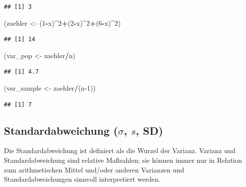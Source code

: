 \documentclass[
]{book}
\newenvironment{Shaded}{\begin{snugshade}}{\end{snugshade}}
\newcommand{\DecValTok}[1]{\textcolor[rgb]{0.00,0.00,0.81}{#1}}
\newcommand{\NormalTok}[1]{#1}
\newcommand{\OperatorTok}[1]{\textcolor[rgb]{0.81,0.36,0.00}{\textbf{#1}}}
\newcommand{\StringTok}[1]{\textcolor[rgb]{0.31,0.60,0.02}{#1}}
\begin{document}
\begin{verbatim}
## [1] 3
\end{verbatim}

\begin{Shaded}
\begin{Highlighting}[]
\NormalTok{(zaehler <-}\StringTok{ }\NormalTok{(}\DecValTok{1}\OperatorTok{-}\NormalTok{x)}\OperatorTok{^}\DecValTok{2}\OperatorTok{+}\NormalTok{(}\DecValTok{2}\OperatorTok{-}\NormalTok{x)}\OperatorTok{^}\DecValTok{2}\OperatorTok{+}\NormalTok{(}\DecValTok{6}\OperatorTok{-}\NormalTok{x)}\OperatorTok{^}\DecValTok{2}\NormalTok{)}
\end{Highlighting}
\end{Shaded}

\begin{verbatim}
## [1] 14
\end{verbatim}

\begin{Shaded}
\begin{Highlighting}[]
\NormalTok{(var_pop <-}\StringTok{ }\NormalTok{zaehler}\OperatorTok{/}\NormalTok{n)}
\end{Highlighting}
\end{Shaded}

\begin{verbatim}
## [1] 4.7
\end{verbatim}

\begin{Shaded}
\begin{Highlighting}[]
\NormalTok{(var_sample <-}\StringTok{ }\NormalTok{zaehler}\OperatorTok{/}\NormalTok{(n}\DecValTok{-1}\NormalTok{))}
\end{Highlighting}
\end{Shaded}

\begin{verbatim}
## [1] 7
\end{verbatim}

\hypertarget{standardabweichung-sigma-s-sd}{%
\subsection{\texorpdfstring{Standardabweichung (\(\sigma\), \(s\), SD)}{Standardabweichung (\textbackslash sigma, s, SD)}}\label{standardabweichung-sigma-s-sd}}

Die Standardabweichung ist definiert als die Wurzel der Varianz. Varianz und Standardabweichung sind relative Maßzahlen; sie können immer nur in Relation zum arithmetischen Mittel und/oder anderen Varianzen und Standardabweichungen sinnvoll interpretiert werden.
\end{document}
